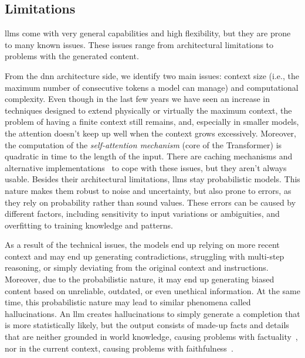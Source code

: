 \documentclass[manuscript,screen]{acmart}
\begin{document}
\subsection{Limitations}
\label{sec:limitations}


\acp{llm} come with very general capabilities and high flexibility, but they are prone to many known issues.
These issues range from architectural limitations to problems with the generated content.

From the \ac{dnn} architecture side, we identify two main issues:
context size (i.e., the maximum number of consecutive tokens a model can manage) and
computational complexity.
Even though in the last few years we have seen an increase in techniques designed to extend physically or virtually the maximum context, the problem of having a finite context still remains, and, especially in smaller models, the attention doesn't keep up well when the context grows excessively.
Moreover, the computation of the \emph{self-attention mechanism} (core of the Transformer) is quadratic in time to the length of the input.
There are caching mechanisms and alternative implementations~\cite{DBLP:journals/corr/abs-2112-05682,DBLP:conf/nips/DaoFERR22,DBLP:conf/iclr/Dao24} to cope with these issues, but they aren't always usable.
Besides their architectural limitations, \acp{llm} stay probabilistic models.
This nature makes them robust to noise and uncertainty, but also prone to errors, as they rely on probability rather than sound values.
These errors can be caused by different factors, including sensitivity to input variations or ambiguities, and overfitting to training knowledge and patterns.

As a result of the technical issues, the models end up relying on more recent context and may end up generating contradictions, struggling with multi-step reasoning, or simply deviating from the original context and instructions.
Moreover, due to the probabilistic nature, it may end up generating biased content based on unreliable, outdated, or even unethical information.
At the same time, this probabilistic nature may lead to similar phenomena called hallucinations.
An \ac{llm} creates hallucinations to simply generate a completion that is more statistically likely, but the output consists of made-up facts and details that are neither grounded in world knowledge, causing problems with factuality~\cite{DBLP:journals/csur/JiLFYSXIBMF23}, nor in the current context, causing problems with faithfulness~\cite{DBLP:journals/csur/JiLFYSXIBMF23}.
\end{document}
